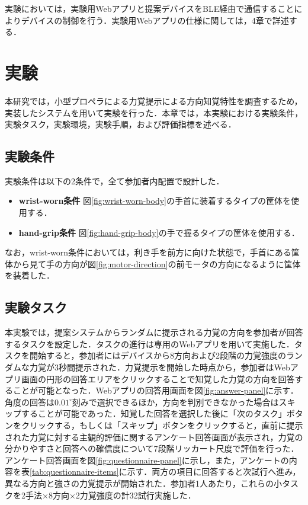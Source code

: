 \documentclass[a4paper,11pt]{jreport}
\begin{document}
実験においては，実験用Webアプリと提案デバイスをBLE経由で通信することによりデバイスの制御を行う．実験用Webアプリの仕様に関しては，4章で詳述する．

\chapter{実験}
本研究では，小型プロペラによる力覚提示による方向知覚特性を調査するため，実装したシステムを用いて実験を行った．本章では，本実験における実験条件，実験タスク，実験環境，実験手順，および評価指標を述べる．

\section{実験条件}
実験条件は以下の2条件で，全て参加者内配置で設計した．

\begin{itemize}
    \item \textbf{wrist-worn条件} 図\ref{fig:wrist-worn-body}の手首に装着するタイプの筐体を使用する．
    \item \textbf{hand-grip条件} 図\ref{fig:hand-grip-body}の手で握るタイプの筐体を使用する．
\end{itemize}

なお，wrist-worn条件においては，利き手を前方に向けた状態で，手首にある筐体から見て手の方向が図\ref{fig:motor-direction}の前モータの方向になるように筐体を装着した．

\section{実験タスク}
\label{sec:experiment-task}
本実験では，提案システムからランダムに提示される力覚の方向を参加者が回答するタスクを設定した．タスクの進行は専用のWebアプリを用いて実施した．タスクを開始すると，参加者にはデバイスから8方向および2段階の力覚強度のランダムな力覚が3秒間提示された．力覚提示を開始した時点から，参加者はWebアプリ画面の円形の回答エリアをクリックすることで知覚した力覚の方向を回答することが可能となった．Webアプリの回答用画面を図\ref{fig:answer-panel}に示す．角度の回答は$0.01^\circ$刻みで選択できるほか，方向を判別できなかった場合はスキップすることが可能であった．知覚した回答を選択した後に「次のタスク」ボタンをクリックする，もしくは「スキップ」ボタンをクリックすると，直前に提示された力覚に対する主観的評価に関するアンケート回答画面が表示され，力覚の分かりやすさと回答への確信度について7段階リッカート尺度で評価を行った．アンケート回答画面を図\ref{fig:questionnaire-panel}に示し，また，アンケートの内容を表\ref{tab:questionnaire-items}に示す．両方の項目に回答すると次試行へ進み，異なる方向と強さの力覚提示が開始された．参加者1人あたり，これらの小タスクを2手法×8方向×2力覚強度の計32試行実施した．
\end{document}
